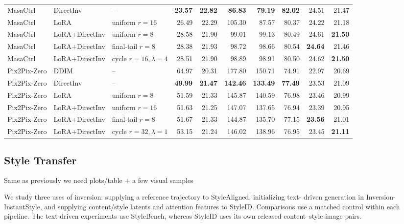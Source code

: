 \documentclass{article} %
\newcommand{\kamil}[1]{{\color{orange}#1}}
\begin{document}
\begin{table}[t]
{\begin{tabular}{lll rrrrrrr}
    MasaCtrl & DirectInv & -- & \textbf{23.57} & \textbf{22.82} & \textbf{86.83} & \textbf{79.19} & \textbf{82.02} & 24.51 & 21.47 \\
    MasaCtrl & LoRA & uniform $r=16$ & 26.49 & 22.29 & 105.30 & 87.57 & 80.37 & 24.22 & 21.18 \\
    MasaCtrl & LoRA+DirectInv & uniform $r=8$ & 28.58 & 21.90 & 99.01 & 99.13 & 80.49 & 24.61 & \textbf{21.50} \\
    MasaCtrl & LoRA+DirectInv & final-tail $r=8$ & 28.38 & 21.93 & 98.72 & 98.66 & 80.54 & \textbf{24.64} & 21.46 \\
    MasaCtrl & LoRA+DirectInv & cycle $r=16,\lambda=4$ & 28.51 & 21.90 & 98.89 & 98.91 & 80.50 & 24.62 & \textbf{21.50} \\
    \midrule
    Pix2Pix-Zero & DDIM & -- & 64.97 & 20.31 & 177.80 & 150.71 & 74.91 & 22.97 & 20.69 \\
    Pix2Pix-Zero & DirectInv & -- & \textbf{49.99} & \textbf{21.47} & \textbf{142.46} & \textbf{133.49} & \textbf{77.49} & 23.53 & 21.09 \\
    Pix2Pix-Zero & LoRA & uniform $r=8$ & 51.59 & 21.33 & 145.87 & 140.59 & 76.98 & 23.46 & 20.99 \\
    Pix2Pix-Zero & LoRA+DirectInv & uniform $r=16$ & 51.63 & 21.25 & 147.07 & 137.65 & 76.94 & 23.39 & 20.95 \\
    Pix2Pix-Zero & LoRA+DirectInv & final-tail $r=8$ & 51.67 & 21.33 & 144.87 & 135.70 & 77.15 & \textbf{23.56} & 21.01 \\
    Pix2Pix-Zero & LoRA+DirectInv & cycle $r=32,\lambda=1$ & 53.15 & 21.24 & 146.02 & 138.96 & 76.95 & 23.45 & \textbf{21.11} \\
    \bottomrule
  \end{tabular}}
\end{table}

\subsection{Style Transfer}

\kamil{Same as previously we need plots/table + a few visual samples}

We study three uses of inversion: supplying a reference trajectory to StyleAligned, initializing text-
driven generation in Inversion-InstantStyle, and supplying content/style latents and attention features
to StyleID. Comparisons use a matched control within each pipeline. The text-driven experiments
use StyleBench, whereas StyleID uses its own released content–style image pairs.
\end{document}
